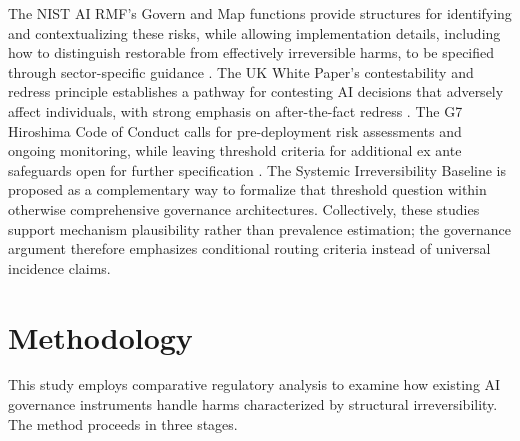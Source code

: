 \documentclass[11pt]{article}
\begin{document}
The NIST AI RMF's Govern and Map functions provide structures for identifying and contextualizing these risks, while allowing implementation details, including how to distinguish restorable from effectively irreversible harms, to be specified through sector-specific guidance \parencite{nistrmf2023}. The UK White Paper's contestability and redress principle establishes a pathway for contesting AI decisions that adversely affect individuals, with strong emphasis on after-the-fact redress \parencite{ukwhitepaper2023}. The G7 Hiroshima Code of Conduct calls for pre-deployment risk assessments and ongoing monitoring, while leaving threshold criteria for additional ex ante safeguards open for further specification \parencite{g7hiroshima2023}. The Systemic Irreversibility Baseline is proposed as a complementary way to formalize that threshold question within otherwise comprehensive governance architectures. Collectively, these studies support mechanism plausibility rather than prevalence estimation; the governance argument therefore emphasizes conditional routing criteria instead of universal incidence claims.

\section{Methodology}


This study employs comparative regulatory analysis \parencite{braithwaite2000} to examine how existing AI governance instruments handle harms characterized by structural irreversibility. The method proceeds in three stages.
\end{document}
